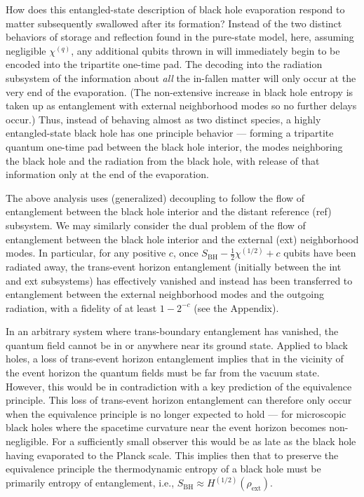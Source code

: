 \documentclass[twocolumn,aps,prl]{revtex4}
\begin{document}
How does this entangled-state description of black hole evaporation
respond to matter subsequently swallowed after its formation? Instead
of the two distinct behaviors of storage and reflection found in the
pure-state model, here, assuming negligible $\chi^{(q)}$, any additional
qubits thrown in will immediately begin to be encoded into the tripartite
one-time pad.  The decoding into the radiation subsystem of the
information about {\it all\/} the in-fallen matter will only occur at 
the very end of the evaporation. (The non-extensive increase in black 
hole entropy is taken up as entanglement with external neighborhood 
modes so no further delays occur.) Thus, instead of behaving almost
as two distinct species, a highly entangled-state black hole has one
principle behavior --- forming a tripartite quantum one-time pad
between the black hole interior, the modes neighboring the black hole
and the radiation from the black hole, with release of that information
only at the end of the evaporation.

The above analysis uses (generalized) decoupling to follow the flow
of entanglement between the black hole interior and the distant reference
(ref) subsystem. We may similarly consider the dual problem of the
flow of entanglement between the black hole interior and the external (ext)
neighborhood modes. In particular, for any positive $c$, once
$S_{\text{BH}}-\frac{1}{2}\chi^{(1/2)} +c$ qubits have been
radiated away, the trans-event horizon entanglement (initially
between the int and ext subsystems) has effectively vanished and
instead has been transferred to entanglement between the
external neighborhood modes and the outgoing radiation, with
a fidelity of at least $1-2^{-c}$ (see the Appendix).

In an arbitrary system where trans-boundary entanglement has vanished,
the quantum field cannot be in or anywhere near its ground state.
Applied to black holes, a loss of trans-event horizon entanglement
implies that in the vicinity of the event horizon the quantum fields
must be far from the vacuum state. However, this would be in contradiction
with a key prediction of the equivalence principle. This loss of
trans-event horizon entanglement can therefore only occur when 
the equivalence principle is no longer expected to hold --- for
microscopic black holes where the spacetime curvature near the event
horizon becomes non-negligible. For a sufficiently small observer this
would be as late as the black hole having evaporated to the Planck scale.
This implies then that to preserve the equivalence principle the
thermodynamic entropy of a black hole must be primarily entropy of
entanglement, i.e., $S_{\text{BH}}\approx H^{(1/2)}(\rho_{\text{ext}})$.
\end{document}
